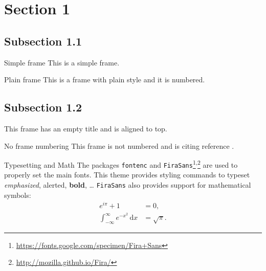     \section{Section 1}
    \subsection{Subsection 1.1}
    \begin{frame}{Simple frame}
        This is a simple frame.
    \end{frame}

    \begin{frame}[plain]{Plain frame}
        This is a frame with plain style and it is numbered.
    \end{frame}
    
    \subsection{Subsection 1.2}
    \begin{frame}[t]
        This frame has an empty title and is aligned to top.
    \end{frame}
    
    \begin{frame}[noframenumbering]{No frame numbering}
        This frame is not numbered and is citing reference \cite{knuth74}.
    \end{frame}
    
    \begin{frame}{Typesetting and Math}
        The packages \texttt{fontenc} and \texttt{FiraSans}\footnote{\url{https://fonts.google.com/specimen/Fira+Sans}}\textsuperscript{,}\footnote{\url{http://mozilla.github.io/Fira/}} are used to properly set the main fonts.
        \vfill
        This theme provides styling commands to typeset \emph{emphasized}, \alert{alerted}, \textbf{bold}, \dots
        \vfill
        \texttt{FiraSans} also provides support for mathematical symbols:
        \begin{align*}
            e^{i\pi} + 1 & = 0, \\
            \int_{-\infty}^\infty e^{-x^2}\,\mathrm{d}x & = \sqrt{\pi}.
        \end{align*}
    \end{frame}

